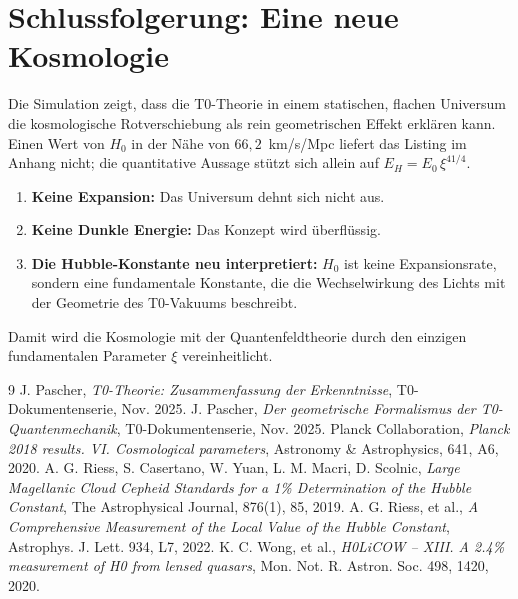 	\section{Schlussfolgerung: Eine neue Kosmologie}
	Die Simulation zeigt, dass die T0-Theorie in einem statischen, flachen Universum die kosmologische Rotverschiebung als rein geometrischen Effekt erklären kann. Einen Wert von $H_0$ in der Nähe von $66{,}2$~km/s/Mpc liefert das Listing im Anhang nicht; die quantitative Aussage stützt sich allein auf $E_H = E_0\,\xi^{41/4}$.
	\begin{enumerate}
		\item \textbf{Keine Expansion:} Das Universum dehnt sich nicht aus.
		\item \textbf{Keine Dunkle Energie:} Das Konzept wird überflüssig.
		\item \textbf{Die Hubble-Konstante neu interpretiert:} $H_0$ ist keine Expansionsrate, sondern eine fundamentale Konstante, die die Wechselwirkung des Lichts mit der Geometrie des T0-Vakuums beschreibt.
	\end{enumerate}
	Damit wird die Kosmologie mit der Quantenfeldtheorie durch den einzigen fundamentalen Parameter $\xi$ vereinheitlicht.
	\begin{thebibliography}{9}
		J. Pascher, \textit{T0-Theorie: Zusammenfassung der Erkenntnisse}, T0-Dokumentenserie, Nov. 2025.
		J. Pascher, \textit{Der geometrische Formalismus der T0-Quantenmechanik}, T0-Dokumentenserie, Nov. 2025.
		Planck Collaboration, \textit{Planck 2018 results. VI. Cosmological parameters}, Astronomy \& Astrophysics, 641, A6, 2020.
		A. G. Riess, S. Casertano, W. Yuan, L. M. Macri, D. Scolnic, \textit{Large Magellanic Cloud Cepheid Standards for a 1\% Determination of the Hubble Constant}, The Astrophysical Journal, 876(1), 85, 2019.
		A. G. Riess, et al., \textit{A Comprehensive Measurement of the Local Value of the Hubble Constant}, Astrophys. J. Lett. 934, L7, 2022.
		K. C. Wong, et al., \textit{H0LiCOW -- XIII. A 2.4\% measurement of H0 from lensed quasars}, Mon. Not. R. Astron. Soc. 498, 1420, 2020.
	\end{thebibliography}
